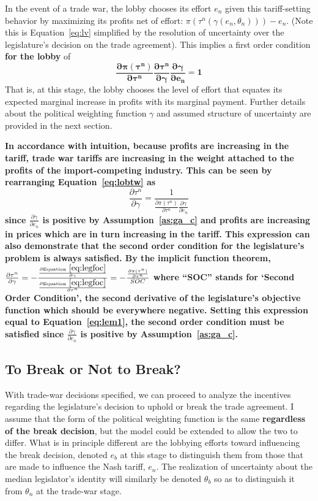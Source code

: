 \documentclass[10pt]{article}
\newcommand{\ve}{\theta}
\newcommand{\ga}{\gamma}
\begin{document}
In the event of a trade war, the lobby chooses its effort $e_n$ given this tariff-setting behavior by maximizing its profits net of effort: $\pi\left(\tau^n\left(\ga\left(e_n,\ve_n\right)\right)\right) - e_n$. (Note this is Equation~\ref{eq:lv} simplified by the resolution of uncertainty over the legislature's decision on the trade agreement). This implies a first order condition \textbf{for the lobby} of
\begin{equation}
	\bm{\frac{\partial \pi(\tau^n)}{\partial \tau^n}\frac{\partial \tau^n}{\partial \ga} \frac{\partial \ga}{\partial e_n} = 1}
  \label{eq:lobtw}
\end{equation}
That is, at this stage, the lobby chooses the level of effort that equates its expected marginal increase in profits with its marginal payment. Further details about the political weighting function $\ga$ and assumed structure of uncertainty are provided in the next section.

\textbf{In accordance with intuition, because profits are increasing in the tariff, trade war tariffs are increasing in the weight attached to the profits of the import-competing industry. This can be seen by rearranging Equation~\ref{eq:lobtw} as 
\begin{equation}
  \frac{\partial \tau^n}{\partial \ga} = \frac{1}{\frac{\partial \pi(\tau^n)}{\partial \tau^n} \frac{\partial \ga}{\partial e_n}}
	\label{eq:lem1}
\end{equation}
since $\frac{\partial \ga}{\partial e_n}$ is positive by Assumption~\ref{as:ga_c} and profits are increasing in prices which are in turn increasing in the tariff. This expression can also demonstrate that the second order condition for the legislature's problem is always satisfied. By the implicit function theorem, $\frac{\partial \tau^n}{\partial \ga} = -\frac{\frac{\partial \text{Equation}~\ref{eq:legfoc}}{\partial \ga}}{\frac{\partial \text{Equation}~\ref{eq:legfoc}}{\partial \tau^n}} = -\frac{\frac{\partial \pi(\tau^n)}{\partial \tau^n}}{SOC}$ where ``SOC'' stands for `Second Order Condition', the second derivative of the legislature's objective function which should be everywhere negative. Setting this expression equal to Equation~\ref{eq:lem1}, the second order condition must be satisfied since $\frac{\partial \ga}{\partial e_n}$ is positive by Assumption~\ref{as:ga_c}.}


\bigskip
\subsection{To Break or Not to Break?}
\label{sec:break}
With trade-war decisions specified, we can proceed to analyze the incentives regarding the legislature's decision to uphold or break the trade agreement. I assume that the form of the political weighting function is the same \textbf{regardless of the break decision}, but the model could be extended to allow the two to differ. What is in principle different are the lobbying efforts toward influencing the break decision, denoted $e_b$ at this stage to distinguish them from those that are made to influence the Nash tariff, $e_n$. The realization of uncertainty about the median legislator's identity will similarly be denoted $\ve_b$ so as to distinguish it from $\ve_n$ at the trade-war stage. 
\end{document}
